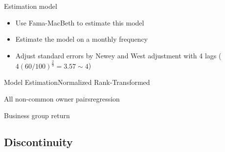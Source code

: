 \documentclass{beamer}
\begin{document}
	
	
	\begin{frame}{Estimation model}
		\begin{itemize}
			\item Use Fama-MacBeth to estimate this model
			
			
			\item Estimate the model on a monthly frequency 
			\item Adjust standard errors by Newey and West adjustment with 4 lags ($ 4(60/100)^{\frac{2}{9}} = 3.57 \sim 4 $)
		\end{itemize}
	\end{frame}
	
	\begin{frame}{Model Estimation}{Normalized Rank-Transformed}
		\label{Monthly15} 
		\begin{table}[htbp]
			\centering
			\resizebox{1\textwidth}{!}{
				
			}
		\end{table}
		
		
	\end{frame}
	
	

%			

\begin{frame}{All non-common owner pairs}{regression}
	\begin{table}[htbp]
		\centering
		\resizebox{1\textwidth}{!}{
			
		}
	\end{table}
\end{frame}

	\begin{frame}{Business group return}
	
	\begin{table}[htbp]
		\centering
		\resizebox{0.6\textwidth}{!}{
			
		}
	\end{table}
\end{frame}
	
	\subsection{Discontinuity}
	
\end{document}
